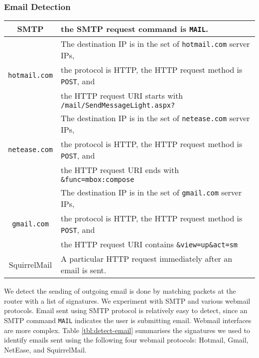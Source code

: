 \subsubsection{Email Detection}

\begin{table*}[bt]
  \centering
  \begin{tabular}{|c|l|}
  \hline
  SMTP     & the SMTP request command is {\tt MAIL}. \\
  \hline
           & The destination IP is in the set of {\tt hotmail.com} server IPs,  \\
  {\tt hotmail.com}  & the protocol is HTTP,
           the HTTP request method is {\tt POST}, and \\
           & the HTTP request URI starts with {\tt /mail/SendMessageLight.aspx?} \\
  \hline
           & The destination IP is in the set of {\tt netease.com} server IPs, \\
  {\tt netease.com}  & the protocol is HTTP,
           the HTTP request method is {\tt POST}, and \\
           & the HTTP request URI ends with {\tt \&func=mbox:compose} \\
  \hline
           & The destination IP is in the set of {\tt gmail.com} server IPs, \\
  {\tt gmail.com}    & the protocol is HTTP,
           the HTTP request method is {\tt POST}, and \\
           & the HTTP request URI contains {\tt \&view=up\&act=sm} \\
  \hline
  SquirrelMail & A particular HTTP request immediately after an email is sent. \\ [0.5ex]
  \hline
  \end{tabular}
  \caption{Rules for email detection. }\label{tbl:detect-email}
\end{table*}

We detect the sending of outgoing email is done by matching packets 
at the router with a list of signatures. 
We experiment with SMTP and various webmail protocols.
Email sent using SMTP protocol is relatively easy to detect, since
an SMTP command {\tt MAIL} indicates the user is submitting email.
Webmail interfaces are more complex.
Table \ref{tbl:detect-email} summarises
the signatures we used to identify emails sent using the following
four webmail protocols: Hotmail, Gmail, NetEase, and SquirrelMail.

